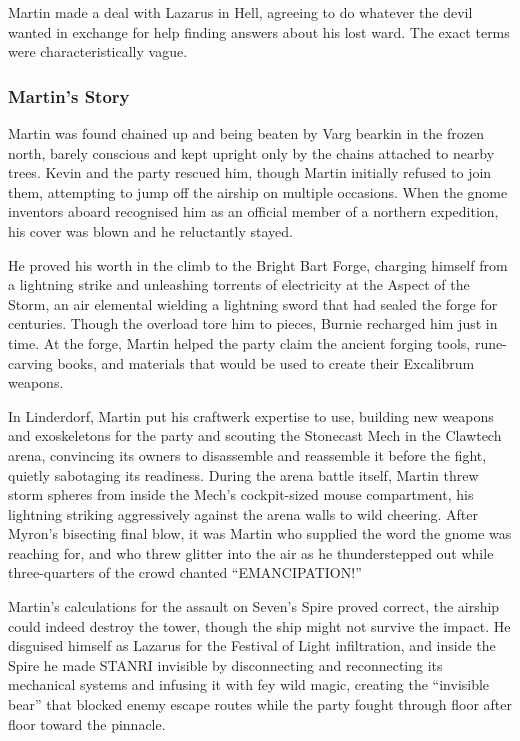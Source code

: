 Martin made a deal with Lazarus in Hell, agreeing to do whatever the devil wanted in exchange for help finding answers about his lost ward.  The exact terms were characteristically vague.

\subsubsection{Martin's Story}

Martin was found chained up and being beaten by Varg bearkin in the frozen north, barely conscious and kept upright only by the chains attached to nearby trees.  Kevin and the party rescued him, though Martin initially refused to join them, attempting to jump off the airship on multiple occasions.  When the gnome inventors aboard recognised him as an official member of a northern expedition, his cover was blown and he reluctantly stayed.

He proved his worth in the climb to the Bright Bart Forge, charging himself from a lightning strike and unleashing torrents of electricity at the Aspect of the Storm, an air elemental wielding a lightning sword that had sealed the forge for centuries.  Though the overload tore him to pieces, Burnie recharged him just in time.  At the forge, Martin helped the party claim the ancient forging tools, rune-carving books, and materials that would be used to create their Excalibrum weapons.

In Linderdorf, Martin put his craftwerk expertise to use, building new weapons and exoskeletons for the party and scouting the Stonecast Mech in the Clawtech arena, convincing its owners to disassemble and reassemble it before the fight, quietly sabotaging its readiness.  During the arena battle itself, Martin threw storm spheres from inside the Mech's cockpit-sized mouse compartment, his lightning striking aggressively against the arena walls to wild cheering.  After Myron's bisecting final blow, it was Martin who supplied the word the gnome was reaching for, and who threw glitter into the air as he thunderstepped out while three-quarters of the crowd chanted ``EMANCIPATION!''

Martin's calculations for the assault on Seven's Spire proved correct, the airship could indeed destroy the tower, though the ship might not survive the impact.  He disguised himself as Lazarus for the Festival of Light infiltration, and inside the Spire he made STANRI invisible by disconnecting and reconnecting its mechanical systems and infusing it with fey wild magic, creating the ``invisible bear'' that blocked enemy escape routes while the party fought through floor after floor toward the pinnacle.

